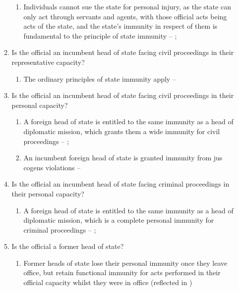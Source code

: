 \begin{enumerate}
\begin{enumerate}
        \begin{enumerate}
            \item Individuals cannot sue the state for personal injury, as the state can only act through servants and agents, with those official acts being acts of the state, and the state's immunity in respect of them is fundamental to the principle of state immunity -- ; 
        \end{enumerate}
        \item Is the official an incumbent head of state facing civil proceedings in their representative capacity?
        \begin{enumerate}
            \item The ordinary principles of state immunity apply -- 
        \end{enumerate}
        \item Is the official an incumbent head of state facing civil proceedings in their personal capacity?
        \begin{enumerate}
            \item A foreign head of state is entitled to the same immunity as a head of diplomatic mission, which grants them a wide immunity for civil proceedings -- ; 
            \item An incumbent foreign head of state is granted immunity from \gls{jus cogens} violations -- 
        \end{enumerate}
        \item Is the official an incumbent head of state facing criminal proceedings in their personal capacity?
        \begin{enumerate}
            \item A foreign head of state is entitled to the same immunity as a head of diplomatic mission, which is a complete personal immunity for criminal proceedings -- ; 
        \end{enumerate}
        \item Is the official a former head of state?
        \begin{enumerate}
            \item Former heads of state lose their personal immunity once they leave office, but retain functional immunity for acts performed in their official capacity whilst they were in office (reflected in )

\end{enumerate}
\end{enumerate}
\end{enumerate}
